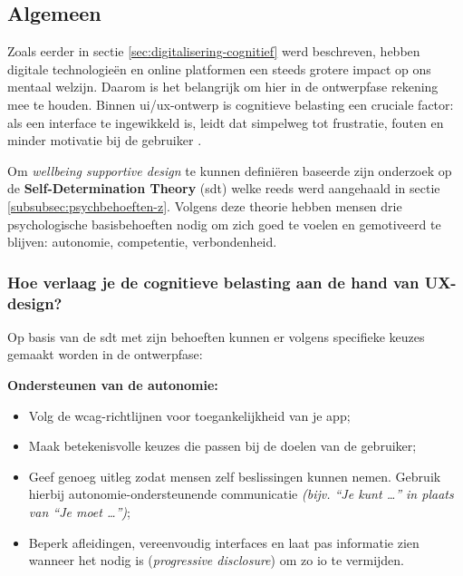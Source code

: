 \subsection{Algemeen}
\label{subsec:uiux-algemeen}

\vspace{1em}

Zoals eerder in sectie \ref{sec:digitalisering-cognitief} werd beschreven, hebben digitale technologieën en online platformen een steeds grotere impact op ons mentaal welzijn. Daarom is het belangrijk om hier in de ontwerpfase rekening mee te houden. Binnen \acrshort{ui}/\acrshort{ux}-ontwerp is cognitieve belasting een cruciale factor: als een interface te ingewikkeld is, leidt dat simpelweg tot frustratie, fouten en minder motivatie bij de gebruiker \autocite{thealien2025cognitiveload}.

\vspace{1em}

Om \textit{wellbeing supportive design} te kunnen definiëren baseerde \textcite{Peters2022} zijn onderzoek op de \textbf{Self-Determination Theory} (\acrshort{sdt}) welke reeds werd aangehaald in sectie \ref{subsubsec:psychbehoeften-z}. Volgens deze theorie hebben mensen drie psychologische basisbehoeften nodig om zich goed te voelen en gemotiveerd te blijven: autonomie, competentie, verbondenheid.

\vspace{1em}

\subsubsection{Hoe verlaag je de cognitieve belasting aan de hand van UX-design?}
\label{subsubsec:cognitieve-belasting-ux}

\vspace{1em}

Op basis van de \acrshort{sdt} met zijn behoeften kunnen er volgens \textcite{Peters2022} specifieke keuzes gemaakt worden in de ontwerpfase:

\vspace{1em}
\vspace{1em}

\textbf{Ondersteunen van de autonomie:}

\begin{itemize}
    \item Volg de \acrshort{wcag}-richtlijnen voor toegankelijkheid van je app;
    \item Maak betekenisvolle keuzes die passen bij de doelen van de gebruiker;
    \item Geef genoeg uitleg zodat mensen zelf beslissingen kunnen nemen. Gebruik hierbij autonomie-ondersteunende communicatie \textit{(bijv. “Je kunt …” in plaats van “Je moet …”)};
    \item Beperk afleidingen, vereenvoudig interfaces en laat pas informatie zien wanneer het nodig is (\textit{progressive disclosure}) om zo \acrshort{io} te vermijden.
\end{itemize}

